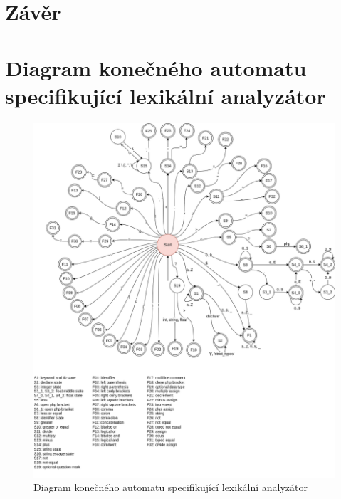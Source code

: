 \documentclass[a4paper, 11pt]{article}
\begin{document}
	\section{Závěr}




	\clearpage
	
	\renewcommand{\refname}{Literatura}
	



	\clearpage
	\appendix


	\section{Diagram konečného automatu specifikující lexikální analyzátor}
	\begin{figure}[!ht]
		\centering
		\includegraphics[width=0.95\linewidth]{fsm.png}
		\caption{Diagram konečného automatu specifikující lexikální analyzátor}
		\label{figure:fa_graph}
	\end{figure}

    \newpage
\end{document}
